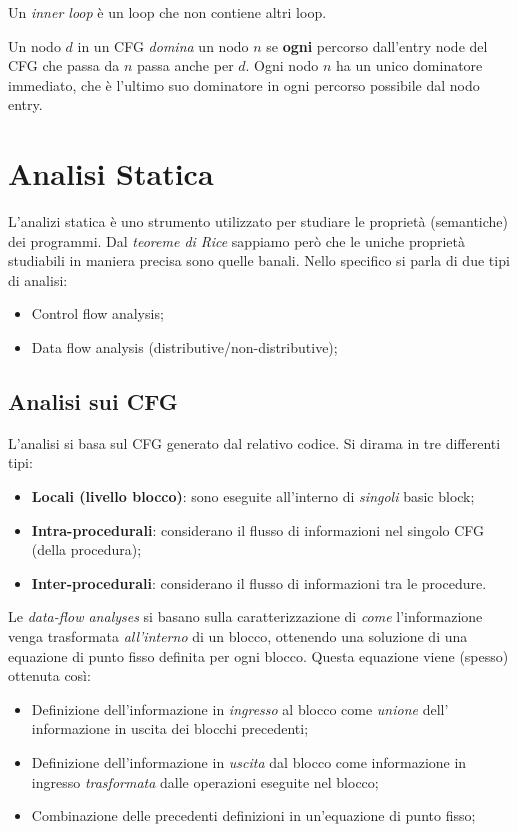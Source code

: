 \documentclass[a4paper, 10pt]{book}
\newenvironment{definition}[1][Definizione]{\begin{trivlist}
\item[\hskip \labelsep {\bfseries #1}]}{\end{trivlist}}
\begin{document}
\begin{definition}[Inner Loop]
    Un \emph{inner loop} è un loop che non contiene altri loop.
\end{definition}

\begin{definition}[Relazione di Dominance]
    Un nodo $d$ in un CFG \emph{domina} un nodo $n$ se \textbf{ogni} percorso dall'entry node del CFG che 
    passa da $n$ passa anche per $d$. Ogni nodo $n$ ha un unico dominatore immediato, che è l'ultimo suo
    dominatore in ogni percorso possibile dal nodo entry.
\end{definition}

\chapter{Analisi Statica}
L'analizi statica è uno strumento utilizzato per studiare le proprietà (semantiche) dei programmi. Dal 
\emph{teoreme di Rice} sappiamo però che le uniche proprietà studiabili in maniera precisa sono quelle
banali. Nello specifico si parla di due tipi di analisi:
\begin{itemize}
	\item Control flow analysis;
	\item Data flow analysis (distributive/non-distributive);
\end{itemize}

\section{Analisi sui CFG}
L'analisi si basa sul CFG generato dal relativo codice. Si dirama in tre differenti tipi:
\begin{itemize}
	\item \textbf{Locali (livello blocco)}: sono eseguite all'interno di \emph{singoli} basic block;
	\item \textbf{Intra-procedurali}: considerano il flusso di informazioni nel singolo CFG (della procedura);
	\item \textbf{Inter-procedurali}: considerano il flusso di informazioni tra le procedure.
\end{itemize}
Le \emph{data-flow analyses} si basano sulla caratterizzazione di \emph{come} l'informazione venga trasformata
\emph{all'interno} di un blocco, ottenendo una soluzione di una equazione di punto fisso definita per ogni
blocco. Questa equazione viene (spesso) ottenuta così:
\begin{itemize}
    \item Definizione dell'informazione in \emph{ingresso} al blocco come \emph{unione} dell' informazione
        in uscita dei blocchi precedenti;
    \item Definizione dell'informazione in \emph{uscita} dal blocco come informazione in ingresso 
        \emph{trasformata} dalle operazioni eseguite nel blocco;
    \item Combinazione delle precedenti definizioni in un'equazione di punto fisso;
\end{itemize}
\end{document}
